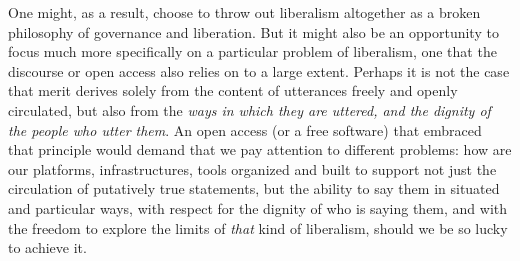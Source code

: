 \documentclass[11pt]{article}
\begin{document}
One might, as a result, choose to throw out liberalism altogether as a broken philosophy of governance and liberation.  But it might also be an opportunity to focus much more specifically on a particular problem of liberalism, one that the discourse or open access also relies on to a large extent.  Perhaps it is not the case that merit derives solely from the content of utterances freely and openly circulated, but also from the \emph{ways in which they are uttered, and the dignity of the people who utter them}.  An open access (or a free software) that embraced that principle would demand that we pay attention to different problems:  how are our platforms, infrastructures, tools organized and built to support not just the circulation of putatively true statements, but the ability to say them in situated and particular ways, with respect for the dignity of who is saying them, and with the freedom to explore the limits of \emph{that} kind of liberalism, should we be so lucky to achieve it. 

\printbibliography
\end{document}
